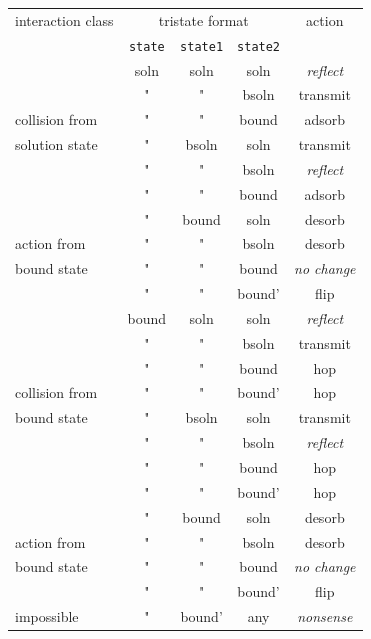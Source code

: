 \documentclass {book}
\newcommand {\ttt} {\texttt}
\begin{document}
\begin{description}
\begin{longtable}[c]{l|ccc|c}
interaction class&\multicolumn{3}{c}{tristate format}&action\\
&\ttt{state}&\ttt{state1}&\ttt{state2}&\\
\hline
&soln&soln&soln&\emph{reflect}\\
&"&"&bsoln&transmit\\
collision from&"&"&bound&adsorb\\
solution state&"&bsoln&soln&transmit\\
&"&"&bsoln&\emph{reflect}\\
&"&"&bound&adsorb\\
\hline
&"&bound&soln&desorb\\
action from&"&"&bsoln&desorb\\
bound state&"&"&bound&\emph{no change}\\
&"&"&bound'&flip\\
\hline
&bound&soln&soln&\emph{reflect}\\
&"&"&bsoln&transmit\\
&"&"&bound&hop\\
collision from&"&"&bound'&hop\\
bound state&"&bsoln&soln&transmit\\
&"&"&bsoln&\emph{reflect}\\
&"&"&bound&hop\\
&"&"&bound'&hop\\
\hline
&"&bound&soln&desorb\\
action from&"&"&bsoln&desorb\\
bound state&"&"&bound&\emph{no change}\\
&"&"&bound'&flip\\
\hline
impossible&"&bound'&any&\emph{nonsense}\\
\end{longtable}


\end{description}
\end{document}
